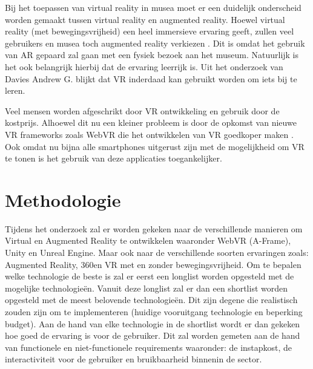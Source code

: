 Bij het toepassen van virtual reality in musea moet er een duidelijk onderscheid worden gemaakt tussen virtual reality en augmented reality. Hoewel virtual reality (met bewegingsvrijheid) een heel immersieve ervaring geeft, zullen veel gebruikers en musea toch augmented reality verkiezen \autocite{Kersten2017}. Dit is omdat het gebruik van AR gepaard zal gaan met een fysiek bezoek aan het museum. Natuurlijk is het ook belangrijk hierbij dat de ervaring leerrijk is. Uit het onderzoek van Davies Andrew G.\textcite{Davies2018} blijkt dat VR inderdaad kan gebruikt worden om iets bij te leren.

Veel mensen worden afgeschrikt door VR ontwikkeling en gebruik door de kostprijs. Alhoewel dit nu een kleiner probleem is door de opkomst van nieuwe VR frameworks zoals WebVR die het ontwikkelen van VR goedkoper maken \autocite{Dibbern2018}. Ook omdat nu bijna alle smartphones uitgerust zijn met de mogelijkheid om VR te tonen is het gebruik van deze applicaties toegankelijker.

\section{Methodologie}
\label{sec:methodologie}

Tijdens het onderzoek zal er worden gekeken naar de verschillende manieren om Virtual en Augmented Reality te ontwikkelen waaronder WebVR (A-Frame), Unity en Unreal Engine. Maar ook naar de verschillende soorten ervaringen zoals: Augmented Reality, 360\textdegree\space en VR met en zonder bewegingsvrijheid. 
Om te bepalen welke technologie de beste is zal er eerst een longlist worden opgesteld met de mogelijke technologieën. Vanuit deze longlist zal er dan een shortlist worden opgesteld met de meest belovende technologieën. Dit zijn degene die realistisch zouden zijn om te implementeren (huidige vooruitgang technologie en beperking budget). Aan de hand van elke technologie in de shortlist wordt er dan gekeken hoe goed de ervaring is voor de gebruiker. Dit zal worden gemeten aan de hand van functionele en niet-functionele requirements waaronder: de instapkost, de interactiviteit voor de gebruiker en bruikbaarheid binnenin de sector.

